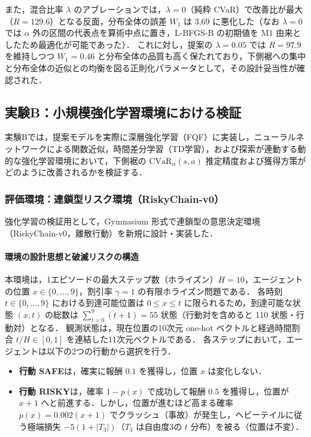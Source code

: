 \documentclass[a4paper,10pt]{jsarticle}
\theoremstyle{definition}
\newcommand{\CVaR}{\mathrm{CVaR}}
\newcommand{\Wone}{W_1}
\begin{document}
また，混合比率 $\lambda$ のアブレーションでは，$\lambda=0$（純粋 CVaR）で改善比が最大（$R=129.6$）となる反面，分布全体の誤差 $\Wone$ は $3.69$ に悪化した（なお $\lambda=0$ では $\alpha$ 外の区間の代表点を算術中点に置き，L-BFGS-B の初期値を M1 由来としたため最適化が可能であった）．
これに対し，提案の $\lambda=0.05$ では $R=97.9$ を維持しつつ $\Wone = 0.46$ と分布全体の品質も高く保たれており，下側裾への集中と分布全体の近似との均衡を図る正則化パラメータとして，その設計妥当性が確認された．

\subsection{実験B：小規模強化学習環境における検証}
\label{subsec:expB}
実験Bでは，提案モデルを実際に深層強化学習（FQF）に実装し，ニューラルネットワークによる関数近似，時間差分学習（TD学習），および探索が連動する動的な強化学習環境において，下側裾の $\CVaR_\alpha(s,a)$ 推定精度および獲得方策がどのように改善されるかを検証する．

\subsubsection{評価環境：連鎖型リスク環境（RiskyChain-v0）}
強化学習の検証用として，Gymnasium 形式で連鎖型の意思決定環境（RiskyChain-v0，離散行動）を新規に設計・実装した．

\paragraph{環境の設計思想と破滅リスクの構造}
本環境は，1エピソードの最大ステップ数（ホライズン）$H=10$，エージェントの位置 $x \in \{0, \dots, 9\}$，割引率 $\gamma=1$ の有限ホライズン問題である．
各時刻 $t \in \{0, \dots, 9\}$ における到達可能位置は $0 \le x \le t$ に限られるため，到達可能な状態 $(x, t)$ の総数は $\sum_{t=0}^9 (t+1) = 55$ 状態（行動対を含めると 110 状態・行動対）となる．
観測状態は，現在位置の10次元 one-hot ベクトルと経過時間割合 $t/H \in [0, 1]$ を連結した11次元ベクトルである．
各ステップにおいて，エージェントは以下の2つの行動から選択を行う．
\begin{itemize}
  \item \textbf{行動 SAFE}は，確実に報酬 $0.1$ を獲得し，位置 $x$ は変化しない．
  \item \textbf{行動 RISKY}は，確率 $1-p(x)$ で成功して報酬 $0.5$ を獲得し，位置が $x+1$ へと前進する．しかし，位置が進むほど高まる確率 $p(x) = 0.002(x+1)$ でクラッシュ（事故）が発生し，ヘビーテイルに従う極端損失 $-5(1+|T_3|)$（$T_3$ は自由度3の $t$ 分布）を被る（位置は不変）．
\end{itemize}
\end{document}
